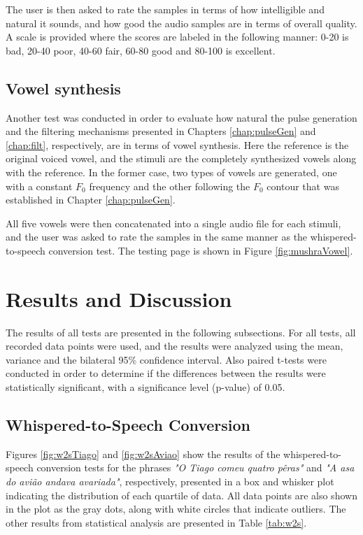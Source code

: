 The user is then asked to rate the samples in terms of how intelligible and natural it sounds, and how good the audio samples are in terms of overall quality. A scale is provided where the scores are labeled in the following manner: 0-20 is bad, 20-40 poor, 40-60 fair, 60-80 good and 80-100 is excellent.

\subsection{Vowel synthesis}

Another test was conducted in order to evaluate how natural the pulse generation and the filtering mechanisms presented in Chapters \ref{chap:pulseGen} and \ref{chap:filt}, respectively, are in terms of vowel synthesis. Here the reference is the original voiced vowel, and the stimuli are the completely synthesized vowels along with the reference. In the former case, two types of vowels are generated, one with a constant $F_0$ frequency and the other following the $F_0$ contour that was established in Chapter \ref{chap:pulseGen}.

All five vowels were then concatenated into a single audio file for each stimuli, and the user was asked to rate the samples in the same manner as the whispered-to-speech conversion test. The testing page is shown in Figure \ref{fig:mushraVowel}.  

\section{Results and Discussion}

The results of all tests are presented in the following subsections. For all tests, all recorded data points were used, and the results were analyzed using the mean, variance and the bilateral 95\% confidence interval. Also paired t-tests were conducted in order to determine if the differences between the results were statistically significant, with a significance level (p-value) of 0.05.

\subsection{Whispered-to-Speech Conversion}

Figures \ref{fig:w2sTiago} and \ref{fig:w2sAviao} show the results of the whispered-to-speech conversion tests for the phrases \textit{"O Tiago comeu quatro pêras"} and \textit{"A asa do avião andava avariada"}, respectively, presented in a box and whisker plot indicating the distribution of each quartile of data. All data points are also shown in the plot as the gray dots, along with white circles that indicate outliers. The other results from statistical analysis are presented in Table \ref{tab:w2s}.

